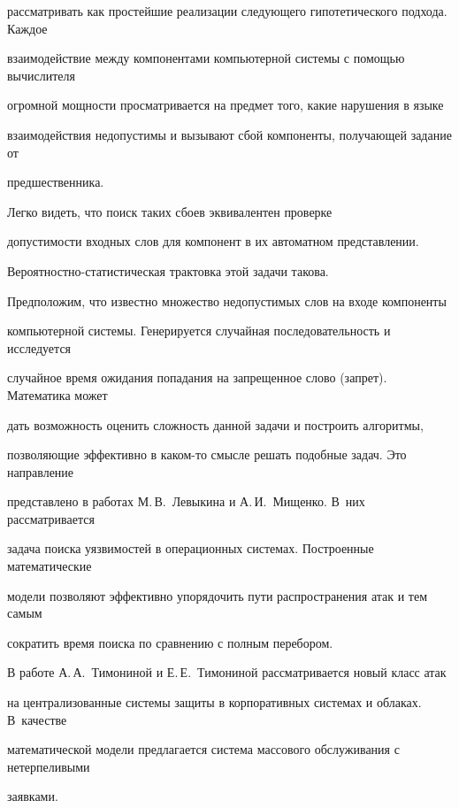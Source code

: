 рассматривать как простейшие реализации следующего гипотетического подхода. Каждое 


взаимодействие между компонентами компьютерной системы с помощью вычислителя 


огромной мощности просматривается на предмет того, какие нарушения в языке 


взаимодействия недопустимы и вызывают сбой компоненты, получающей задание от 


предшественника. 





Легко видеть, что поиск таких сбоев эквивалентен проверке 


допустимости входных слов для компонент в их автоматном представлении. 


     Ве\-ро\-ят\-ност\-но-ста\-ти\-сти\-че\-ская трактовка этой задачи такова. 


Предположим, что известно множество недопустимых слов на входе компоненты 


компьютерной системы. Генерируется случайная последовательность и исследуется 


случайное время ожидания попадания на запрещенное слово (запрет). Математика может 


дать возможность оценить сложность данной задачи и построить алгоритмы, 


позволяющие эффективно в ка\-ком-то смысле решать подобные задач. Это направление 


представлено в работах М.\,В.~Левыкина и А.\,И.~Мищенко. В~них рассматривается 


задача поиска уязвимостей в операционных системах. Построенные математические 


модели позволяют эффективно упорядочить пути распространения атак и тем самым 


сократить время поиска по сравнению с полным перебором. 


     


     В работе А.\,А.~Тимониной и Е.\,Е.~Тимониной рассматривается новый класс атак 


на централизованные системы защиты в корпоративных системах и облаках. В~качестве 


математической модели предлагается система массового обслуживания с нетерпеливыми 


заявками. 


     


